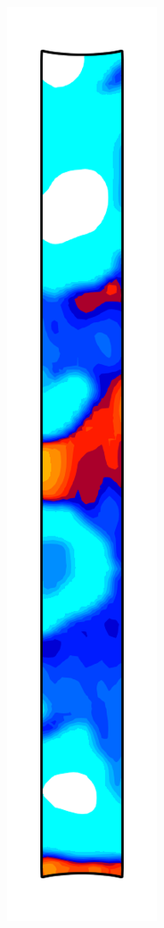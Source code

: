 \begin{figure}[!htb]
\begin{subfigure}{0.08\textwidth}
  \end{subfigure}
  \begin{subfigure}{0.08\textwidth}
    \centering
    \includegraphics[width=\textwidth]{Chapter5/figures/spallation/c_4}

\end{subfigure}
\end{figure}
